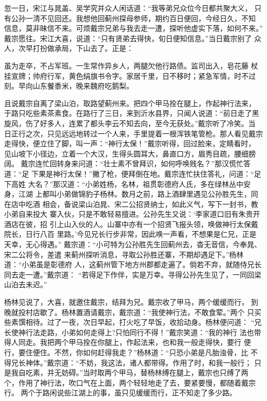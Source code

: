忽一日，宋江与晁盖、吴学究并众人闲话道：“我等弟兄众位今日都共聚大义，
只有公孙一清不见回还。我想他回蓟州探母参师，期约百日便回，今经日久，不知
信息，莫非昧信不来。可烦戴宗兄弟与我去走一遭，探听他虚实下落，如何不来。”
戴宗愿往。宋江大喜，说道：“只有贤弟去得快，旬日便知信息。”当日戴宗别了
众人，次早打扮做承局，下山去了。正是：

虽为走卒，不占军班。一生常作异乡人，两腿欠他行路债。监司出入，皂花藤
杖挂宣牌；帅府行军，黄色绢旗书令字。家居千里，日不移时；紧急军情，时不过
刻。早向山东餐黍米，晚来魏府吃鹅梨。

且说戴宗自离了梁山泊，取路望蓟州来。把四个甲马拴在腿上，作起神行法来，
于路只吃些素茶素食。在路行了三日，来到沂水县界，只闻人说道：“前日走了黑
旋风，伤了好多人，连累了都头李云不知去向，至今无获处。”戴宗听了冷笑。当
日正行之次，只见远远地转过一个人来，手里提着一根浑铁笔管枪。那人看见戴宗
走得快，便立住了脚，叫一声：“神行太保！”戴宗听得，回过脸来，定睛看时，
见山坡下小径边，立着一个大汉，生得头圆耳大，鼻直口方，眉秀目疏，腰细膀阔。
戴宗连忙回转身来问道：“壮士素不曾拜识，如何呼唤贱名？”那汉慌忙答道：“足
下果是神行太保！”撇了枪，便拜倒在地。戴宗连忙扶住答礼，问道：“足下高姓
大名？”那汉道：“小弟姓杨，名林，祖贯彰德府人氏，多在绿林丛中安身，江湖
上都叫小弟做锦豹子杨林。数月之前，路上酒肆里遇见公孙胜先生，同在店中吃酒
相会，备说梁山泊晁、宋二公招贤纳士，如此义气，写下一封书，教小弟自来投大
寨入伙，只是不敢轻易擅进。公孙先生又说：‘李家道口旧有朱贵开酒店在彼，招
引上山入伙的人。山寨中亦有一个招贤飞报头领，唤做神行太保戴院长，日行八百
里路。’今见兄长行步非常，因此唤一声看，不想果是仁兄，正是天幸，无心得遇。”
戴宗道：“小可特为公孙胜先生回蓟州去，杳无音信，今奉晁、宋二公将令，差遣
来蓟州探听消息，寻取公孙胜还寨，不期却遇足下。”杨林道：“小弟虽是彰德府
人，这蓟州管下地方州郡都走遍了。倘若不弃，就随侍兄长同去走一遭。”戴宗道：
“若得足下作伴，实是万幸。寻得公孙先生见了，一同回梁山泊去未迟。”

杨林见说了，大喜，就邀住戴宗，结拜为兄。戴宗收了甲马，两个缓缓而行，
到晚就投村店歇了。杨林置酒请戴宗，戴宗道：“我使神行法，不敢食荤。”两个
只买些素馔相待。过了一夜，次日早起，打火吃了早饭，收拾动身。杨林便问道：
“兄长使神行法走路，小弟如何走得上?只怕同行不得！”戴宗笑道：“我的神行
法也带得人同走。我把两个甲马拴在你腿上，作起法来，也和我一般走得快，要行
便行，要住便住。不然，你如何赶得我走？”杨林道：“只恐小弟是凡胎浊骨，比
不得兄长神体。”戴宗道：“不妨，我这法，诸人都带得。作用了时，和我一般行；
只是我自吃素，并无妨碍。”当时取两个甲马，替杨林缚在腿上，戴宗也只缚了两
个，作用了神行法，吹口气在上面，两个轻轻地走了去，要紧要慢，都随着戴宗行。
两个于路闲说些江湖上的事，虽只见缓缓而行，正不知走了多少路。

